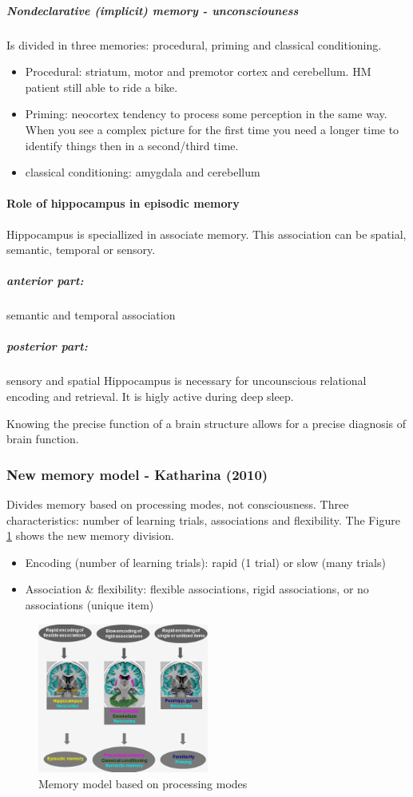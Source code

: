 \documentclass[12pt,article,oneside,a4paper]{memoir}
\begin{document}
\subparagraph{Nondeclarative (implicit) memory - unconsciouness}
Is divided in three memories: procedural, priming and classical conditioning. 
\begin{itemize}
\item Procedural: striatum, motor and premotor cortex and cerebellum.
\subitem HM patient still able to ride a bike.
\item Priming: neocortex
\subitem tendency to process some perception in the same way. When you see a complex picture for the first time you need a longer time to identify things then in a second/third time.
\item classical conditioning: amygdala and cerebellum
\end{itemize}

\paragraph{Role of hippocampus in episodic memory} Hippocampus is speciallized in associate memory. This association can be spatial, semantic, temporal or sensory.
\subparagraph{anterior part:} semantic and temporal association
\subparagraph{posterior part:} sensory and spatial
Hippocampus is necessary for uncounscious relational encoding and retrieval. It is higly active during deep sleep.

Knowing the precise function of a brain structure allows for a precise diagnosis of brain function.

\subsubsection{New memory model - Katharina (2010)}
Divides memory based on processing modes, not consciousness. Three characteristics: number of learning trials, associations and flexibility. The Figure \ref{fig:new-memory-model} shows the new memory division.
\begin{itemize}
\item Encoding (number of learning trials): rapid (1 trial) or slow (many trials)
\item Association \& flexibility: flexible associations, rigid associations, or no associations (unique item) 
\end{itemize}

\begin{figure}[h]
  \centering
  \includegraphics[width=0.5\textwidth]{imgs/new-memory-model.png}
  \caption{Memory model based on processing modes}
  \label{fig:new-memory-model}
\end{figure}
\end{document}
